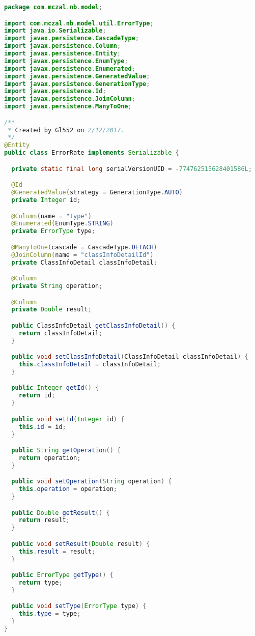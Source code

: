 \begin{lstlisting}[language=Java,basicstyle=\tiny,caption=ErrorRate.java]
package com.mczal.nb.model;

import com.mczal.nb.model.util.ErrorType;
import java.io.Serializable;
import javax.persistence.CascadeType;
import javax.persistence.Column;
import javax.persistence.Entity;
import javax.persistence.EnumType;
import javax.persistence.Enumerated;
import javax.persistence.GeneratedValue;
import javax.persistence.GenerationType;
import javax.persistence.Id;
import javax.persistence.JoinColumn;
import javax.persistence.ManyToOne;

/**
 * Created by Gl552 on 2/12/2017.
 */
@Entity
public class ErrorRate implements Serializable {

  private static final long serialVersionUID = -774762515628401586L;

  @Id
  @GeneratedValue(strategy = GenerationType.AUTO)
  private Integer id;

  @Column(name = "type")
  @Enumerated(EnumType.STRING)
  private ErrorType type;

  @ManyToOne(cascade = CascadeType.DETACH)
  @JoinColumn(name = "classInfoDetailId")
  private ClassInfoDetail classInfoDetail;

  @Column
  private String operation;

  @Column
  private Double result;

  public ClassInfoDetail getClassInfoDetail() {
    return classInfoDetail;
  }

  public void setClassInfoDetail(ClassInfoDetail classInfoDetail) {
    this.classInfoDetail = classInfoDetail;
  }

  public Integer getId() {
    return id;
  }

  public void setId(Integer id) {
    this.id = id;
  }

  public String getOperation() {
    return operation;
  }

  public void setOperation(String operation) {
    this.operation = operation;
  }

  public Double getResult() {
    return result;
  }

  public void setResult(Double result) {
    this.result = result;
  }

  public ErrorType getType() {
    return type;
  }

  public void setType(ErrorType type) {
    this.type = type;
  }
}

\end{lstlisting}

